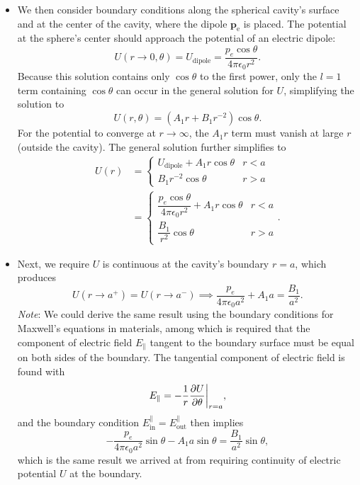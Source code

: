 \documentclass[11pt, a4paper]{article}
\renewcommand{\vec}[1]{\bm{#1}} %
\newcommand{\ee}{\epsilon_{0}}  %
\newcommand{\pe}{\vec{p}_{\text{e}}}  %
\begin{document}
\begin{itemize}
	\item We then consider boundary conditions along the spherical cavity's surface and at the center of the cavity, where the dipole $ \pe $ is placed. The potential at the sphere's center should approach the potential of an electric dipole:
	\begin{equation*}
		U(r \to 0, \theta) = U_{\mathrm{dipole}} = \frac{p_{e}\cos \theta}{4 \pi \ee r^{2}}.
	\end{equation*}
	Because this solution contains only $ \cos \theta $ to the first power, only the $ l = 1 $ term containing $ \cos \theta $ can occur in the general solution for $ U $, simplifying the solution to
	\begin{equation*}
		U(r, \theta) = (A_{1}r + B_{1}r^{-2})\cos \theta.
	\end{equation*}
	For the potential to converge at $  r \to \infty $, the $ A_{1}r $ term must vanish at large $ r $ (outside the cavity). The general solution further simplifies to
	\begin{align*}
		U(r) &= 
		\begin{cases}
			U_{\text{dipole}} + A_{1}r \cos \theta & r < a\\
			B_{1}r^{-2} \cos \theta & r > a
		\end{cases}\\
		& = 
		\begin{cases}
			\dfrac{p_{e}\cos \theta}{4 \pi \ee r^{2}} + A_{1}r \cos \theta & r < a\\[2mm]
			\dfrac{B_{1}}{r^{2}}\cos \theta & r > a
		\end{cases}.
	\end{align*}
	
	\item Next, we require $ U $ is continuous at the cavity's boundary $ r = a $, which produces
	\begin{equation*}
		U(r \to a^{+}) = U(r \to a^{-}) \implies \frac{p_{e}}{4\pi \ee a^{2}} + A_{1}a = \frac{B_{1}}{a^{2}}.
	\end{equation*}
	\textit{Note}: We could derive the same result using the boundary conditions for Maxwell's equations in materials, among which is required that the component of electric field $ E_{\parallel} $ tangent to the boundary surface must be equal on both sides of the boundary. The tangential component of electric field is found with
	\begin{equation*}
		E_{\parallel} = -\frac{1}{r}\pdv{U}{\theta}\bigg |_{r=a},
	\end{equation*}
	and the boundary condition $ E_{\text{in}}^{\parallel} = E_{\text{out}}^{\parallel}  $ then implies 
	\begin{equation*}
		- \frac{p_{e}}{4\pi \ee a^{2}} \sin \theta - A_{1} a \sin \theta = \frac{B_{1}}{a^{2}} \sin \theta,
	\end{equation*}
	which is the same result we arrived at from requiring continuity of electric potential $ U $ at the boundary. 
	

\end{itemize}
\end{document}
